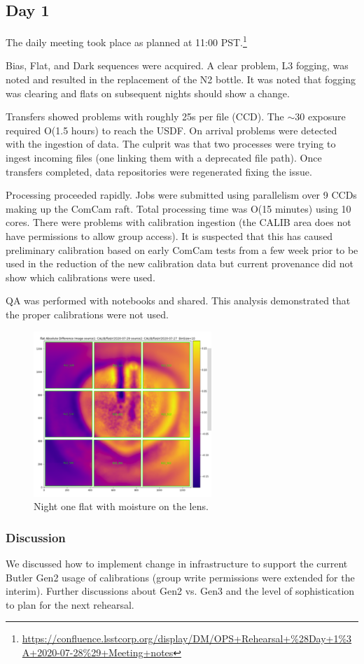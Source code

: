 \subsection{Day 1} \label{sec:day1}

The daily meeting took place as planned at 11:00 PST.\footnote{\url{https://confluence.lsstcorp.org/display/DM/OPS+Rehearsal+\%28Day+1\%3A+2020-07-28\%29+Meeting+notes}}

Bias, Flat, and Dark sequences were acquired.  A clear problem, L3 fogging, was
noted and resulted in the replacement of the N2 bottle.  It was noted that
fogging was clearing and flats on subsequent nights should show a change.

Transfers showed problems with roughly 25s per file (CCD).  The $\sim$30 exposure
required O(1.5 hours) to reach the USDF.  On arrival problems were detected with
the ingestion of data.  The culprit was that two processes were trying to ingest
incoming files (one linking them with a deprecated file path).  Once transfers
completed, data repositories were regenerated fixing the issue.

Processing proceeded rapidly.  Jobs were submitted using parallelism over 9 CCDs
making up the ComCam raft.  Total processing time was O(15 minutes) using 10 cores.
There were problems with calibration ingestion (the CALIB area does not have
permissions to allow group access).  It is suspected that this has caused preliminary
calibration based on early ComCam tests from a few week prior to be used in the
reduction of the new calibration data but current provenance did not show
which calibrations were used.

QA was performed with notebooks  and shared.  This analysis demonstrated that the
proper calibrations were not used.

\begin{figure}
\includegraphics[width=0.6\textwidth]{figures/n1moist}
\caption{Night one flat with moisture on the lens.\label{fig:d1}}
\end{figure}

\subsubsection{Discussion}
We discussed how to implement change in infrastructure to support the current
Butler Gen2 usage of calibrations (group write permissions were extended for the
interim).  Further discussions about Gen2 vs. Gen3 and the level of sophistication
to plan for the next rehearsal.

